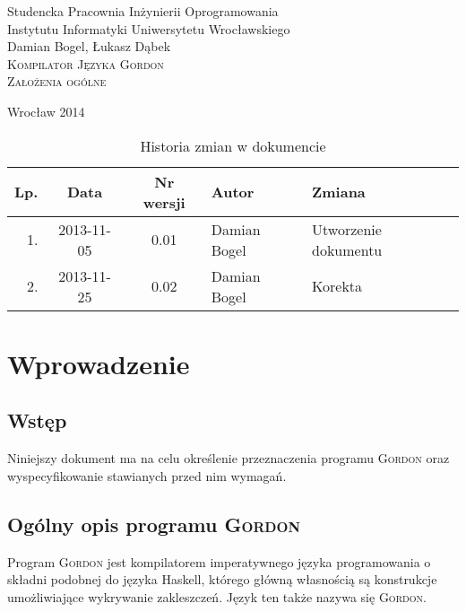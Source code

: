 \documentclass{documentation}
\begin{document}
\begin{titlepage}
\begin{center}
Studencka Pracownia Inżynierii Oprogramowania\\
Instytutu Informatyki Uniwersytetu Wrocławskiego\\[6cm]

Damian Bogel, Łukasz Dąbek\\[1cm]
\textsc{\LARGE Kompilator Języka Gordon}\\[0.5cm]
\textsc{\large Założenia ogólne}

\vfill
Wrocław 2014 \\[2.5cm]

\end{center}
\end{titlepage}

\newpage
\begin{table}
	\centering
    \captionsetup{name=Tabela,labelsep=period}
	\caption{Historia zmian w dokumencie}
		\begin{tabular}{|r|c|c|l|l|}
		\hline
		Lp.  & Data       & Nr wersji & Autor                 & Zmiana \\ \hline
		1.   & 2013-11-05 & 0.01 & Damian Bogel & Utworzenie dokumentu \\ \hline
		2.   & 2013-11-25 & 0.02 & Damian Bogel & Korekta \\ \hline
	\end{tabular}
\end{table}
\newpage

\tableofcontents
\setcounter{page}{2}

\newpage

\section{Wprowadzenie}
\subsection{Wstęp}
\noindent Niniejszy dokument ma na celu określenie przeznaczenia programu
\textsc{Gordon} oraz wyspecyfikowanie stawianych przed nim wymagań.

\subsection{Ogólny opis programu \textsc{Gordon}}
\noindent Program \textsc{Gordon} jest kompilatorem imperatywnego języka
programowania o składni podobnej do języka Haskell, którego główną własnością
są konstrukcje umożliwiające wykrywanie zakleszczeń. Język ten także nazywa się
\textsc{Gordon}.
\end{document}

